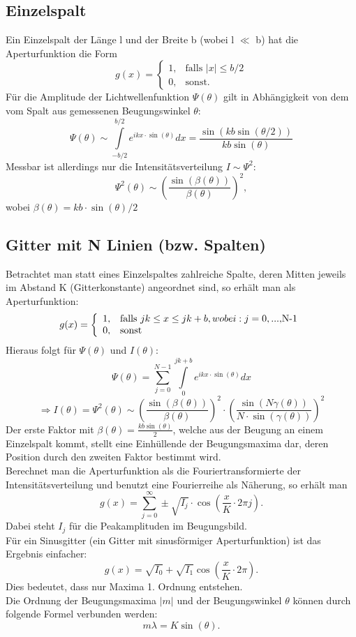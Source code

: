 \subsection{Einzelspalt}
Ein Einzelspalt der Länge l und der Breite b (wobei l $\ll$ b) hat die Aperturfunktion die Form
\[g(x)=\left\{\begin{array}{cl}1, & \mbox{falls }\left|x\right|\le b/2\\ 0, & \mbox{sonst.} \end{array}\right.\]
Für die Amplitude der Lichtwellenfunktion $\Psi(\theta)$ gilt in Abhängigkeit von dem vom Spalt aus gemessenen Beugungswinkel $\theta$:
\[\Psi(\theta)\sim \int\limits_{-b/2}^{b/2} e^{ikx\cdot \sin(\theta)}dx=\frac{\sin(kb\sin(\theta/2))}{kb\sin(\theta)}\]
Messbar ist allerdings nur die Intensitätsverteilung $I\sim \Psi^{2}$: \[\Psi^{2}(\theta)\sim \left(\frac{\sin(\beta(\theta))}{\beta(\theta)}\right)^{2},\] wobei $\beta(\theta)=kb\cdot\sin(\theta)/2$
\subsection{Gitter mit N Linien (bzw. Spalten)}
Betrachtet man statt eines Einzelspaltes zahlreiche Spalte, deren Mitten jeweils im Abstand K (Gitterkonstante) angeordnet sind, so erhält man als Aperturfunktion: \[g(x)=\left\{\begin{array}{cl}1, & \mbox{falls }jk\le x \le jk+b, wobei: j=0,...,$N-1$\\ 0, & \mbox{sonst} \end{array}\right.\]
Hieraus folgt für $\Psi(\theta)$ und $I(\theta)$:\[\Psi(\theta)=\sum\limits_{j=0}^{N-1}\int\limits_{0}^{jk+b}e^{ikx\cdot\sin(\theta)}dx\] \[\Rightarrow I(\theta)=\Psi^{2}(\theta)\sim \left(\frac{\sin(\beta(\theta))}{\beta(\theta)}\right)^{2}\cdot\left(\frac{\sin(N\gamma(\theta))}{N\cdot\sin(\gamma(\theta))}\right)^{2}\]
Der erste Faktor mit $\beta(\theta)=\frac{kb\sin(\theta)}{2}$, welche aus der Beugung an einem Einzelspalt kommt, stellt eine Einhüllende der Beugungsmaxima dar, deren Position durch den zweiten Faktor bestimmt wird.\\
Berechnet man die Aperturfunktion als die Fouriertransformierte der Intensitätsverteilung und benutzt eine Fourierreihe als Näherung, so erhält man \[g(x)=\sum\limits_{j=0}^{\infty}\pm\sqrt{I_{j}}\cdot\cos\left(\frac{x}{K}\cdot 2\pi j\right).\]
Dabei steht $I_{j}$ für die Peakamplituden im Beugungsbild.\\
Für ein Sinusgitter (ein Gitter mit sinusförmiger Aperturfunktion) ist das Ergebnis einfacher: \[g(x)=\sqrt{I_{0}}+\sqrt{I_{1}}\cos\left(\frac{x}{K}\cdot 2\pi\right).\]
Dies bedeutet, dass nur Maxima 1. Ordnung entstehen.\\
Die Ordnung der Beugungsmaxima $\left|m\right|$ und der Beugungswinkel $\theta$ können durch folgende Formel verbunden werden:\\
\[m\lambda=K\sin(\theta).\]
